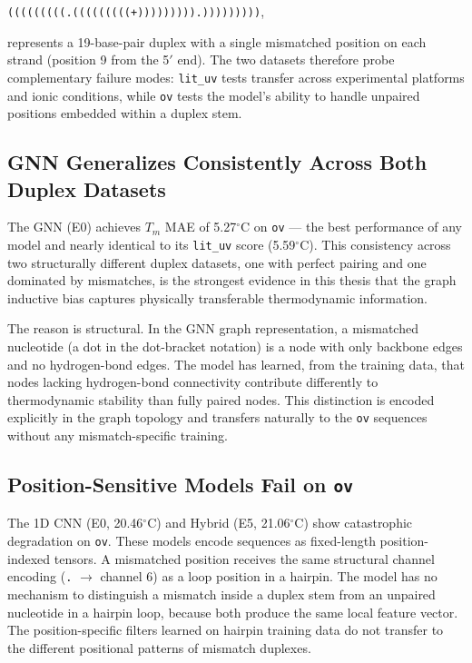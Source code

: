 \documentclass[12pt,oneside,letterpaper]{report}
\begin{document}
\begin{center}
\texttt{(((((((((.(((((((((+))))))))).)))))))))},
\end{center}

\noindent represents a 19-base-pair duplex with a single mismatched position on each strand (position 9 from the 5$'$ end). The two datasets therefore probe complementary failure modes: \texttt{lit\_uv} tests transfer across experimental platforms and ionic conditions, while \texttt{ov} tests the model's ability to handle unpaired positions embedded within a duplex stem.

\subsection{GNN Generalizes Consistently Across Both Duplex Datasets}

The GNN (E0) achieves $T_m$ MAE of 5.27$^\circ$C on \texttt{ov} --- the best performance of any model and nearly identical to its \texttt{lit\_uv} score (5.59$^\circ$C). This consistency across two structurally different duplex datasets, one with perfect pairing and one dominated by mismatches, is the strongest evidence in this thesis that the graph inductive bias captures physically transferable thermodynamic information.

The reason is structural. In the GNN graph representation, a mismatched nucleotide (a dot in the dot-bracket notation) is a node with only backbone edges and no hydrogen-bond edges. The model has learned, from the training data, that nodes lacking hydrogen-bond connectivity contribute differently to thermodynamic stability than fully paired nodes. This distinction is encoded explicitly in the graph topology and transfers naturally to the \texttt{ov} sequences without any mismatch-specific training.

\subsection{Position-Sensitive Models Fail on \texttt{ov}}

The 1D CNN (E0, 20.46$^\circ$C) and Hybrid (E5, 21.06$^\circ$C) show catastrophic degradation on \texttt{ov}. These models encode sequences as fixed-length position-indexed tensors. A mismatched position receives the same structural channel encoding (\texttt{.} $\to$ channel 6) as a loop position in a hairpin. The model has no mechanism to distinguish a mismatch inside a duplex stem from an unpaired nucleotide in a hairpin loop, because both produce the same local feature vector. The position-specific filters learned on hairpin training data do not transfer to the different positional patterns of mismatch duplexes.
\end{document}
